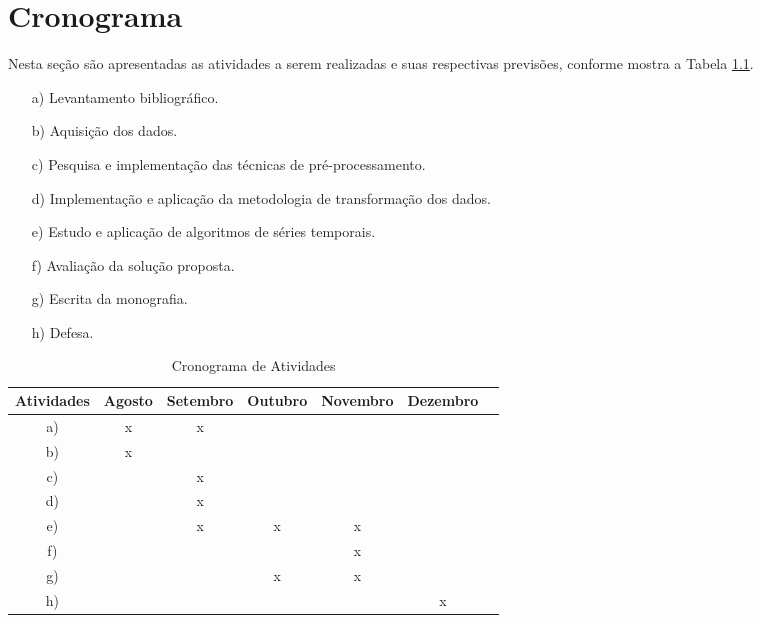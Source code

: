 \documentclass[../main.tex]{subfiles}
\begin{document}
\chapter{Cronograma}
Nesta seção são apresentadas as atividades a serem realizadas e suas respectivas previsões, conforme mostra a Tabela \ref{CRONOGRAMA}.

\begin{enumerate}

\item[ a) ] Levantamento bibliográfico.
\item[ b) ] Aquisição dos dados.
\item[ c) ] Pesquisa e implementação das técnicas de pré-processamento.
\item[ d) ] Implementação e aplicação da metodologia de transformação dos dados.
\item[ e) ] Estudo e aplicação de algoritmos de séries temporais.
\item[ f) ] Avaliação da solução proposta.
\item[ g) ] Escrita da monografia.
\item[ h) ] Defesa.

\end{enumerate}

\begin{table}
\centering
\caption{Cronograma de Atividades}
\label{CRONOGRAMA}
\begin{tabular}{|c|c|c|c|c|c|c|}
\hline
Atividades & Agosto & Setembro & Outubro & Novembro & Dezembro\\\hline
a) & x & x &   &   &   \\\hline
b) & x &   &   &   &   \\\hline
c) &   & x &   &   &   \\\hline
d) &   & x &   &   &   \\\hline
e) &   & x & x & x &   \\\hline
f) &   &   &   & x &   \\\hline
g) &   &   & x & x &   \\\hline
h) &   &   &   &   & x \\\hline
\end{tabular}
\end{table}
\end{document}
